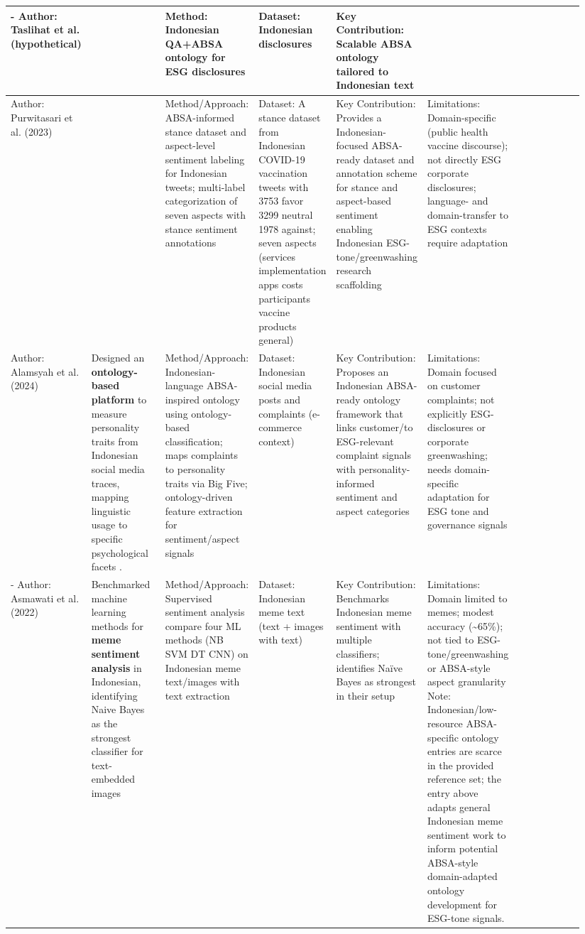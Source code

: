 \documentclass{article}
\begin{document}
\begin{landscape}
\begin{longtable}{p{0.134\linewidth} p{0.134\linewidth} p{0.134\linewidth} p{0.134\linewidth} p{0.134\linewidth} p{0.134\linewidth} p{0.134\linewidth}}
- Author: Taslihat et al. (hypothetical) & ~ & Method: Indonesian QA+ABSA ontology for ESG disclosures & Dataset: Indonesian disclosures & Key Contribution: Scalable ABSA ontology tailored to Indonesian text & ~ \\ \hline
Author: Purwitasari et al. (2023) & ~ & Method/Approach: ABSA-informed stance dataset and aspect-level sentiment labeling for Indonesian tweets; multi-label categorization of seven aspects with stance sentiment annotations & Dataset: A stance dataset from Indonesian COVID-19 vaccination tweets with 3753 favor 3299 neutral 1978 against; seven aspects (services implementation apps costs participants vaccine products general) & Key Contribution: Provides a Indonesian-focused ABSA-ready dataset and annotation scheme for stance and aspect-based sentiment enabling Indonesian ESG-tone/greenwashing research scaffolding & Limitations: Domain-specific (public health vaccine discourse); not directly ESG corporate disclosures; language- and domain-transfer to ESG contexts require adaptation \\ \hline
Author: Alamsyah et al. (2024) & Designed an \textbf{ontology-based platform} to measure personality traits from Indonesian social media traces, mapping linguistic usage to specific psychological facets  \parencite{andry_alamsyah_974e599c}. & Method/Approach: Indonesian-language ABSA-inspired ontology using ontology-based classification; maps complaints to personality traits via Big Five; ontology-driven feature extraction for sentiment/aspect signals & Dataset: Indonesian social media posts and complaints (e-commerce context) & Key Contribution: Proposes an Indonesian ABSA-ready ontology framework that links customer/to ESG-relevant complaint signals with personality-informed sentiment and aspect categories & Limitations: Domain focused on customer complaints; not explicitly ESG-disclosures or corporate greenwashing; needs domain-specific adaptation for ESG tone and governance signals \\ \hline
- Author: Asmawati et al. (2022) & Benchmarked machine learning methods for \textbf{meme sentiment analysis} in Indonesian, identifying Naive Bayes as the strongest classifier for text-embedded images  \parencite{endah_asmawati_5101cb57} & Method/Approach: Supervised sentiment analysis compare four ML methods (NB SVM DT CNN) on Indonesian meme text/images with text extraction & Dataset: Indonesian meme text (text + images with text) & Key Contribution: Benchmarks Indonesian meme sentiment with multiple classifiers; identifies Naïve Bayes as strongest in their setup & Limitations: Domain limited to memes; modest accuracy (\textasciitilde{}65\%); not tied to ESG-tone/greenwashing or ABSA-style aspect granularity Note: Indonesian/low-resource ABSA-specific ontology entries are scarce in the provided reference set; the entry above adapts general Indonesian meme sentiment work to inform potential ABSA-style domain-adapted ontology development for ESG-tone signals. \\ \hline

\end{longtable}
\end{landscape}
\end{document}

